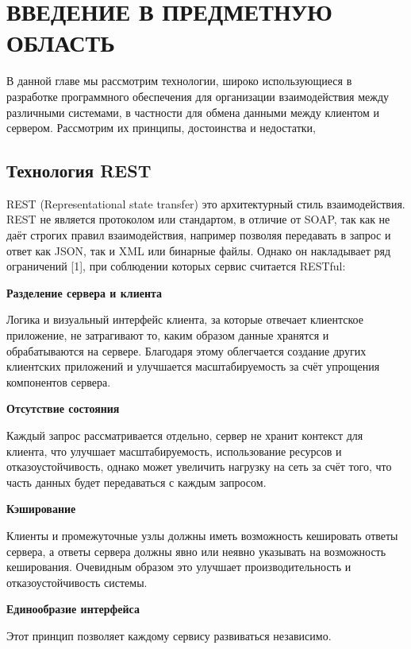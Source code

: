 \chapter{ВВЕДЕНИЕ В ПРЕДМЕТНУЮ ОБЛАСТЬ} \label{ch:ch1}

В данной главе мы рассмотрим технологии, широко использующиеся в разработке программного обеспечения для организации взаимодействия между различными системами, в частности для обмена данными между клиентом и сервером.
Рассмотрим их принципы, достоинства и недостатки,

\section{Технология REST}\label{sec:rest}

REST (Representational state transfer) это архитектурный стиль взаимодействия.
REST не является протоколом или стандартом, в отличие от SOAP, так как не даёт строгих правил взаимодействия, например позволяя передавать в запрос и ответ как JSON, так и XML или бинарные файлы.
Однако он накладывает ряд ограничений [1], при соблюдении которых сервис считается RESTful:

\textbf{Разделение сервера и клиента}

Логика и визуальный интерфейс клиента, за которые отвечает клиентское приложение, не затрагивают то, каким образом данные хранятся и обрабатываются на сервере.
Благодаря этому облегчается создание других клиентских приложений и улучшается масштабируемость за счёт упрощения компонентов сервера.

\textbf{Отсутствие состояния}

Каждый запрос рассматривается отдельно, сервер не хранит контекст для клиента, что улучшает масштабируемость, использование ресурсов и отказоустойчивость, однако может увеличить нагрузку на сеть за счёт того, что часть данных будет передаваться с каждым запросом.

\textbf{Кэширование}

Клиенты и промежуточные узлы должны иметь возможность кешировать ответы сервера, а ответы сервера должны явно или неявно указывать на возможность кеширования.
Очевидным образом это улучшает производительность и отказоустойчивость системы.

\textbf{Единообразие интерфейса}

Этот принцип позволяет каждому сервису развиваться независимо.

